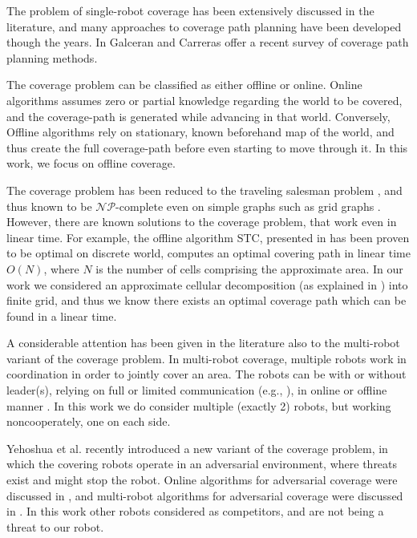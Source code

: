 The problem of single-robot coverage has been extensively discussed in the literature, and many approaches to coverage path planning have been developed though the years. In \cite{galceran2013survey} Galceran and Carreras offer a recent survey of coverage path planning methods.

The coverage problem can be classified as either offline or online. 
Online algorithms assumes zero or partial knowledge regarding the world to be covered, and the coverage-path is generated while advancing in that world. Conversely, Offline algorithms rely on stationary, known beforehand map of the world, and thus create the full coverage-path before even starting to move through it. In this work, we focus on offline coverage.

The coverage problem has been reduced to the traveling salesman problem \cite{arkin2000approximation}, and thus known to be $\mathcal{NP}$-complete even on simple graphs such as grid graphs \cite{papadimitriou1977euclidean}. However, there are known solutions to the coverage problem, that work even in linear time. For example, the offline algorithm STC, presented in \cite{gabriely2001spanning} has been proven to be optimal on discrete world, computes an optimal covering path in linear time $O(N)$, where $N$ is the number of cells comprising the approximate area. In our work we considered an approximate cellular decomposition (as explained in \cite{galceran2013survey}) into finite grid, and thus we know there exists an optimal coverage path which can be found in a linear time.

A considerable attention has been given in the literature also to the multi-robot variant of the coverage problem. In multi-robot coverage, multiple robots work in coordination in order to jointly cover an area. The robots can be with or without leader(s), relying on full or limited communication (e.g., \cite{agmon2008giving}), in online or offline manner \cite{agmon2008giving, de2005blind}.
In this work we do consider multiple (exactly 2) robots, but working noncooperately, one on each side.

Yehoshua et al. \cite{yehoshua2013robotic} recently introduced a new variant of the coverage problem, in which the covering robots operate in an adversarial environment, where threats exist and might stop the robot. Online algorithms for adversarial coverage were discussed in  \cite{yehoshua2015online}, and multi-robot algorithms for adversarial coverage were discussed in \cite{yehoshua2016multi}.
In this work other robots considered as competitors, and are not being a threat to our robot. %

